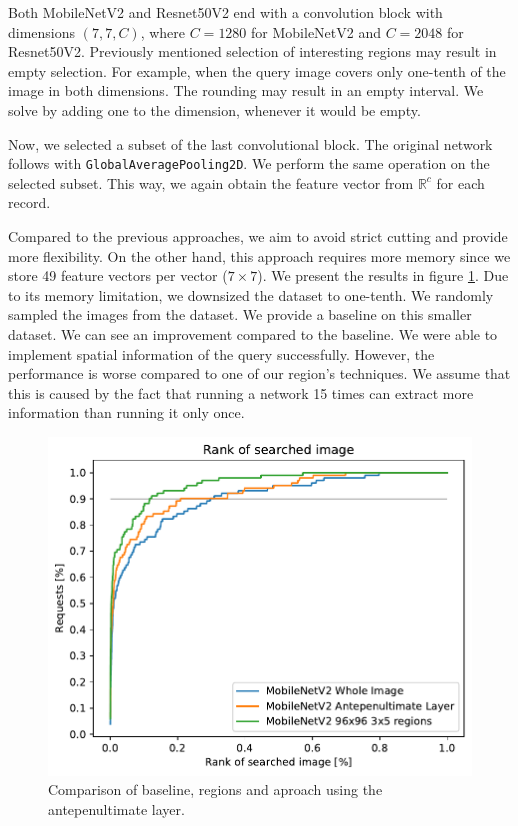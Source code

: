 Both MobileNetV2 and Resnet50V2 end with a convolution block with dimensions $(7,7,C)$, where $C = 1280$ for MobileNetV2 and $C = 2048$ for Resnet50V2. Previously mentioned selection of interesting regions may result in empty selection. For example, when the query image covers only one-tenth of the image in both dimensions. The rounding may result in an empty interval. We solve by adding one to the dimension, whenever it would be empty.

Now, we selected a subset of the last convolutional block. The original network follows with \verb+GlobalAveragePooling2D+. We perform the same operation on the selected subset. This way, we again obtain the feature vector from $\mathbb{R}^c$ for each record.

Compared to the previous approaches, we aim to avoid strict cutting and provide more flexibility. On the other hand, this approach requires more memory since we store 49 feature vectors per vector ($7\times7$). We present the results in figure \ref{fig:antepenultimate}. Due to its memory limitation, we downsized the dataset to one-tenth. We randomly sampled the images from the dataset. We provide a baseline on this smaller dataset. We can see an improvement compared to the baseline. We were able to implement spatial information of the query successfully. However, the performance is worse compared to one of our region's techniques. We assume that this is caused by the fact that running a network 15 times can extract more information than running it only once.

\begin{figure}
    \centering
    \includegraphics[width=0.8\linewidth]{graphs/adaf8d435bb40406f9ce40654ec396e04453ab76cf0776d2a87d385055d5424f.pdf}
    \caption{Comparison of baseline, regions and aproach using the antepenultimate layer.}
    \label{fig:antepenultimate}
\end{figure}

